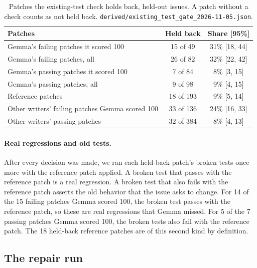 \documentclass[10pt,letterpaper]{article}
\begin{document}
\begin{table}[H]
\centering
\small
\caption{Patches the existing-test check holds back, held-out issues. A patch without a check counts as not held
back. \texttt{derived/existing\_test\_gate\_2026-11-05.json}.}
\label{tab:gate}
\begin{tabular}{@{}lcc@{}}
\toprule
Patches & Held back & Share [95\%] \\
\midrule
Gemma's failing patches it scored 100 & 15 of 49 & 31\% [18, 44] \\
Gemma's failing patches, all & 26 of 82 & 32\% [22, 42] \\
Gemma's passing patches it scored 100 & 7 of 84 & 8\% [3, 15] \\
Gemma's passing patches, all & 9 of 98 & 9\% [4, 15] \\
Reference patches & 18 of 193 & 9\% [5, 14] \\
Other writers' failing patches Gemma scored 100 & 33 of 136 & 24\% [16, 33] \\
Other writers' passing patches & 32 of 384 & 8\% [4, 13] \\
\bottomrule
\end{tabular}
\end{table}

\paragraph{Real regressions and old tests.} After every decision was made, we ran each held-back patch's broken tests
once more with the reference patch applied. A broken test that passes with the reference patch is a real regression.
A broken test that also fails with the reference patch asserts the old behavior that the issue asks to change. For 14
of the 15 failing patches Gemma scored 100, the broken test passes with the reference patch, so these are real
regressions that Gemma missed. For 5 of the 7 passing patches Gemma scored 100, the broken tests also fail with the
reference patch. The 18 held-back reference patches are of this second kind by definition.

\subsection*{The repair run}
\end{document}
